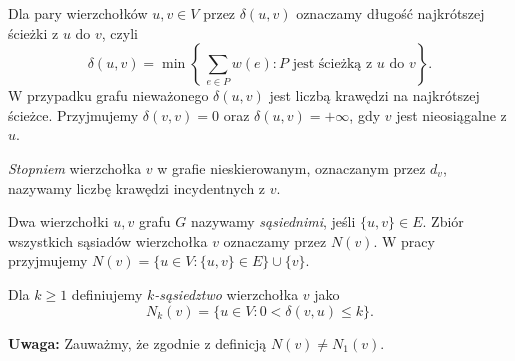 \begin{definicja}
Dla pary wierzchołków $u, v \in V$ przez $\delta(u, v)$ oznaczamy
długość najkrótszej ścieżki z $u$ do $v$, czyli
\[
\delta(u,v) = \min\!\left\{\,\sum_{e \in P} w(e)
  : P \text{ jest ścieżką z } u \text{ do } v\right\}.
\]
W przypadku grafu nieważonego $\delta(u, v)$ jest liczbą krawędzi
na najkrótszej ścieżce. Przyjmujemy $\delta(v, v) = 0$ oraz
$\delta(u, v) = +\infty$, gdy $v$ jest nieosiągalne z $u$.
\end{definicja}

\begin{definicja}
\emph{Stopniem} wierzchołka $v$ w grafie nieskierowanym, oznaczanym
przez $d_v$, nazywamy liczbę krawędzi incydentnych z $v$.
\end{definicja}

\begin{definicja}
Dwa wierzchołki $u, v$ grafu $G$ nazywamy \emph{sąsiednimi}, jeśli
$\{u, v\} \in E$. Zbiór wszystkich sąsiadów wierzchołka $v$
oznaczamy przez $N(v)$. W  pracy przyjmujemy
$N(v) = \{u \in V : \{u,v\} \in E\} \cup \{v\}$.
\end{definicja}

\begin{definicja}
Dla $k \geq 1$ definiujemy \emph{$k$-sąsiedztwo} wierzchołka $v$ jako
\[
N_k(v) = \{u \in V \colon 0 < \delta(v, u) \leq k\}.
\]
\end{definicja}
\noindent\textbf{Uwaga:} Zauważmy, że zgodnie z definicją $N(v) \ne N_1(v)$.